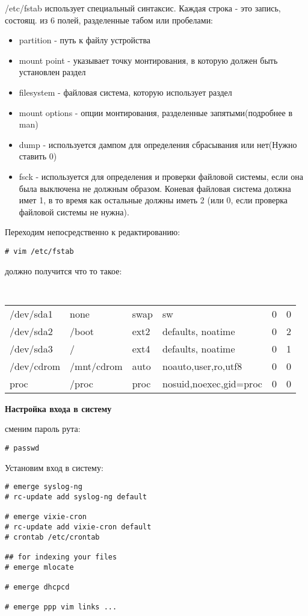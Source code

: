 \documentclass[10pt, a4paper]{article}
\begin{document}
/etc/fstab использует специальный синтаксис. Каждая строка - это запись, состоящ. из 6 полей, разделенные табом или пробелами:
\begin{itemize}
\item partition - путь к файлу устройства
\item mount point - указывает точку монтирования, в которую должен быть установлен раздел
\item filesystem - файловая система, которую использует раздел
\item mount options - опции монтирования, разделенные запятыми(подробнее в man)
\item dump - используется дампом для определения сбрасывания или нет(Нужно ставить 0)
\item fsck - используется для определения и проверки файловой системы, если она была выключена не должным образом. Коневая файловая система должна имет 1, в то время как остальные должны иметь 2 (или 0, если проверка файловой системы не нужна).
\end{itemize}

Переходим непосредственно к редактированию:

\begin{verbatim}
# vim /etc/fstab
\end{verbatim}

должно получится что то такое:
\newline

{
\tt
\begin{tabular}{llllcc}
/dev/sda1 & none & swap & sw & 0 & 0 \\
/dev/sda2 & /boot & ext2 & defaults, noatime & 0 & 2\\
/dev/sda3 & / & ext4 & defaults, noatime & 0 & 1 \\
/dev/cdrom& /mnt/cdrom & auto & noauto,user,ro,utf8 & 0 & 0 \\
proc & /proc & proc & nosuid,noexec,gid=proc & 0 & 0 \\
\end{tabular}
}

{\bf Настройка входа в систему}

сменим пароль рута:

\begin{verbatim}
# passwd
\end{verbatim}

Установим вход в систему:

\begin{verbatim}
# emerge syslog-ng
# rc-update add syslog-ng default

# emerge vixie-cron
# rc-update add vixie-cron default
# crontab /etc/crontab

## for indexing your files
# emerge mlocate

# emerge dhcpcd

# emerge ppp vim links ...
\end{verbatim}
\end{document}

